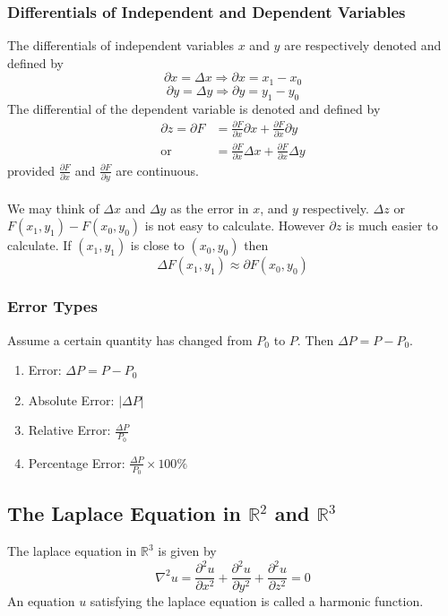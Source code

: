 \documentclass[14pt]{article}
\begin{document}
    \subsubsection{Differentials of Independent and Dependent Variables}
    The differentials of independent variables $x$ and $y$ are
    respectively denoted and defined by
    $$\partial x=\Delta x\Rightarrow\partial x=x_1-x_0$$
    $$\partial y=\Delta y\Rightarrow\partial y=y_1-y_0$$ The
    differential of the dependent variable is denoted and defined by
    \begin{align*}
        \partial z=\partial F &=\frac{\partial F}{\partial x}\partial x+\frac{\partial F}{\partial x}\partial y\\
        \text{or} &= \frac{\partial F}{\partial x}\Delta x+\frac{\partial F}{\partial x}\Delta y
    \end{align*}
    provided $\frac{\partial F}{\partial x}$ and $\frac{\partial
    F}{\partial y}$ are continuous.\\\\
    We may think of $\Delta x$ and $\Delta y$ as the error in $x$, and
    $y$ respectively. $\Delta z$ or $F(x_1, y_1)-F(x_0, y_0)$ is not
    easy to calculate. However $\partial z$ is much easier to calculate.
    If $(x_1,y_1)$ is close to $(x_0, y_0)$ then
    $$\Delta F(x_1, y_1)\approx \partial F(x_0, y_0)$$
    \subsubsection{Error Types}
    Assume a certain quantity has changed from $P_0$ to $P$. Then
    $\Delta P= P-P_0$.
    \begin{enumerate}
        \item Error: $\Delta P=P-P_0$
        \item Absolute Error: $|\Delta P|$
        \item Relative Error: $\frac{\Delta P}{P_0}$
        \item Percentage Error: $\frac{\Delta P}{P_0}\times 100\% $ 
    \end{enumerate}
    \subsection{The Laplace Equation in $\mathbb{R}^2$ and $\mathbb{R}^3$}
    The laplace equation in $\mathbb{R}^3$ is given by
    $$\nabla^2u=\frac{\partial^2u}{\partial x^2}+\frac{\partial^2
    u}{\partial y^2}+\frac{\partial^2 u}{\partial z^2}=0$$ An equation
    $u$ satisfying the laplace equation is called a harmonic function.
\end{document}
